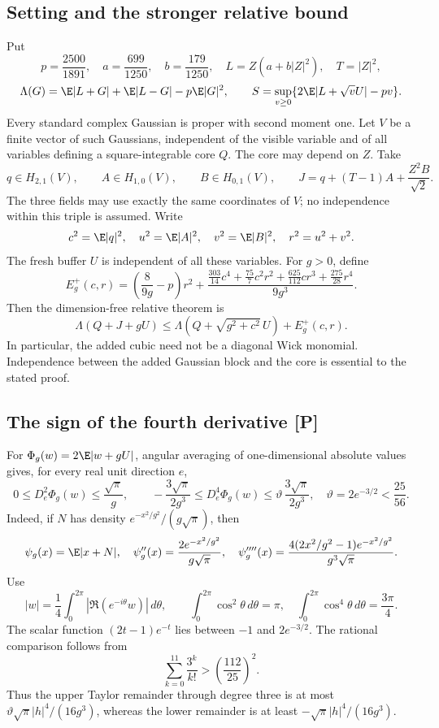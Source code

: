\subsection{Setting and the stronger relative bound}
Put
\[
 p=\frac{2500}{1891},\quad a=\frac{699}{1250},\quad
 b=\frac{179}{1250},\quad L=Z(a+b|Z|^2),\quad T=|Z|^2,
\]
\[
 \Lambda(G)=\E|L+G|+\E|L-G|-p\E|G|^2,\qquad
 S=\sup_{v\ge0}\{2\E|L+\sqrt vU|-pv\}.
\]
Every standard complex Gaussian is proper with second moment one.
Let \(V\) be a finite vector of such Gaussians, independent of the
visible variable and of all variables defining a square-integrable
core \(Q\). The core may depend on \(Z\).
Take
\[
 q\in H_{2,1}(V),\qquad A\in H_{1,0}(V),\qquad
 B\in H_{0,1}(V),\qquad
 J=q+(T-1)A+\frac{Z^2B}{\sqrt2}.
\]
The three fields may use exactly the same coordinates of \(V\);
no independence within this triple is assumed. Write
\[
 c^2=\E|q|^2,\quad u^2=\E|A|^2,\quad v^2=\E|B|^2,\quad
 r^2=u^2+v^2.
\]
The fresh buffer \(U\) is independent of all these variables.
For \(g>0\), define
\[
 \boxed{
 E_g^+(c,r)=\left(\frac8{9g}-p\right)r^2+
 \frac{\frac{303}{14}c^4+\frac{75}{7}c^2r^2+
              \frac{625}{112}cr^3+\frac{275}{28}r^4}{9g^3}.}
 \tag{52.1}
\]
Then the dimension-free relative theorem is
\[
 \boxed{\Lambda(Q+J+gU)
 \le\Lambda\!\left(Q+\sqrt{g^2+c^2}\,U\right)+E_g^+(c,r).}
 \tag{52.2}
\]
In particular, the added cubic need not be a diagonal Wick monomial.
Independence between the added Gaussian block and the core is essential
to the stated proof.

\subsection{The sign of the fourth derivative [P]}
For \(\Phi_g(w)=2\E|w+gU|\), angular averaging of one-dimensional
absolute values gives, for every real unit direction \(e\),
\[
 0\le D_e^2\Phi_g(w)\le\frac{\sqrt\pi}{g},\qquad
 -\frac{3\sqrt\pi}{2g^3}\le D_e^4\Phi_g(w)
 \le\vartheta\,\frac{3\sqrt\pi}{2g^3},
 \quad \vartheta=2e^{-3/2}<\frac{25}{56}.
 \tag{52.3}
\]
Indeed, if \(N\) has density \(e^{-x^2/g^2}/(g\sqrt\pi)\), then
\[
 \psi_g(x)=\E|x+N|,\quad
 \psi_g''(x)=\frac{2e^{-x^2/g^2}}{g\sqrt\pi},\quad
 \psi_g''''(x)=
 \frac{4(2x^2/g^2-1)e^{-x^2/g^2}}{g^3\sqrt\pi}.
\]
Use
\[
 |w|=\frac14\int_0^{2\pi}|\Re(e^{-i\theta}w)|\,d\theta,
 \qquad
 \int_0^{2\pi}\cos^2\theta\,d\theta=\pi,\quad
 \int_0^{2\pi}\cos^4\theta\,d\theta=\frac{3\pi}{4}.
\]
The scalar function \((2t-1)e^{-t}\) lies between \(-1\) and
\(2e^{-3/2}\).
The rational comparison follows from
\[
 \sum_{k=0}^{11}\frac{3^k}{k!}>\left(\frac{112}{25}\right)^2.
\]
Thus the upper Taylor remainder through degree three is at most
\(\vartheta\sqrt\pi|h|^4/(16g^3)\), whereas the lower remainder is at
least \(-\sqrt\pi|h|^4/(16g^3)\).

